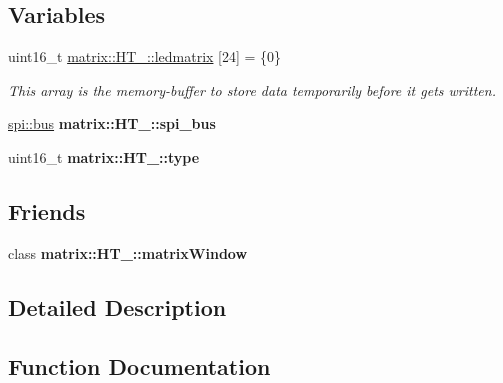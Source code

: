 \subsection*{Variables}
\begin{DoxyCompactItemize}
\item 
\mbox{\label{group___h_t__1632_gaaa0ec3078d91783cb444a6d22e365d0f}} 
uint16\+\_\+t \hyperlink{group___h_t__1632_gaaa0ec3078d91783cb444a6d22e365d0f}{matrix\+::\+H\+T\+\_\+::ledmatrix} \mbox{[}24\mbox{]} = \{0\}
\begin{DoxyCompactList}\small\item\em This array is the memory-\/buffer to store data temporarily before it gets written. \end{DoxyCompactList}\item 
\mbox{\label{group___h_t__1632_ga9205293567235e397cd40d2e335827d1}} 
\hyperlink{classspi_1_1bus}{spi\+::bus} {\bfseries matrix\+::\+H\+T\+\_\+::spi\+\_\+bus}
\item 
\mbox{\label{group___h_t__1632_gaa7b2fbb13d6f148d786759e14f524dcf}} 
uint16\+\_\+t {\bfseries matrix\+::\+H\+T\+\_\+::type}
\end{DoxyCompactItemize}
\subsection*{Friends}
\begin{DoxyCompactItemize}
\item 
\mbox{\label{group___h_t__1632_ga5d50c06d2d3886cdd866cb20891d05c0}} 
class {\bfseries matrix\+::\+H\+T\+\_\+::matrix\+Window}
\end{DoxyCompactItemize}


\subsection{Detailed Description}


\subsection{Function Documentation}
\mbox{\label{group___h_t__1632_gac1c948d2a7639d54c6cc2a0d6aee0d2f}} 
